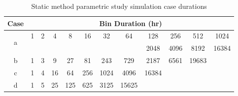 \documentclass[review,12pt]{elsarticle}
\begin{document}
\begin{table}[htbp!]
\centering
\caption{Static method parametric study simulation case durations}
\label{tab:static case durations}
\begin{tabular}{cccccccccccc}
Case                                     & \multicolumn{11}{c}{Bin Duration (hr)}                                                                                                                                                                                                                                                                             \\ \hline
\multicolumn{1}{|c|}{\multirow{2}{*}{a}} & \multicolumn{1}{c|}{1} & \multicolumn{1}{c|}{2}  & \multicolumn{1}{c|}{4}   & \multicolumn{1}{c|}{8}     & \multicolumn{1}{c|}{16}    & \multicolumn{1}{c|}{32}    & \multicolumn{1}{c|}{64}    & \multicolumn{1}{c|}{128}   & \multicolumn{1}{c|}{256}  & \multicolumn{1}{c|}{512}   & \multicolumn{1}{c|}{1024}  \\ \cline{2-12} 
\multicolumn{1}{|c|}{}                   &                        &                         &                          &                            &                            &                            & \multicolumn{1}{c|}{}      & \multicolumn{1}{c|}{2048}  & \multicolumn{1}{c|}{4096} & \multicolumn{1}{c|}{8192}  & \multicolumn{1}{c|}{16384} \\ \hline
\multicolumn{1}{|c|}{b}                  & \multicolumn{1}{c|}{1} & \multicolumn{1}{c|}{3}  & \multicolumn{1}{c|}{9}   & \multicolumn{1}{c|}{27}    & \multicolumn{1}{c|}{81}    & \multicolumn{1}{c|}{243}   & \multicolumn{1}{c|}{729}   & \multicolumn{1}{c|}{2187}  & \multicolumn{1}{c|}{6561} & \multicolumn{1}{c|}{19683} &                            \\ \cline{1-11}
\multicolumn{1}{|c|}{c}                  & \multicolumn{1}{c|}{1} & \multicolumn{1}{c|}{4}  & \multicolumn{1}{c|}{16}  & \multicolumn{1}{c|}{64}    & \multicolumn{1}{c|}{256}   & \multicolumn{1}{c|}{1024}  & \multicolumn{1}{c|}{4096}  & \multicolumn{1}{c|}{16384} &                           &                            &                            \\ \cline{1-9}
\multicolumn{1}{|c|}{d}                  & \multicolumn{1}{c|}{1} & \multicolumn{1}{c|}{5}  & \multicolumn{1}{c|}{25}  & \multicolumn{1}{c|}{125}   & \multicolumn{1}{c|}{625}   & \multicolumn{1}{c|}{3125}  & \multicolumn{1}{c|}{15625} &                            &                           &                            &                            \\ \cline{1-8}

\end{tabular}
\end{table}
\end{document}
